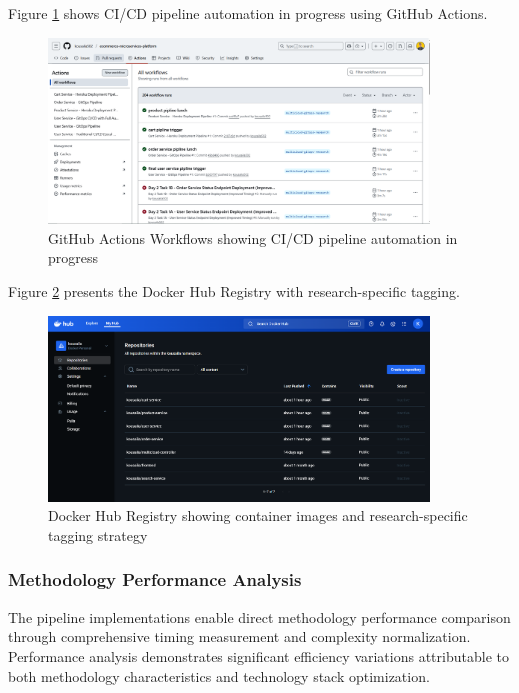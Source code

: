 Figure \ref{fig:github-actions-running} shows CI/CD pipeline automation in progress using GitHub Actions.

\begin{figure}[H]
\centering
\includegraphics[width=0.9\textwidth]{figures/chapter5/github-actions-running.png}
\caption{GitHub Actions Workflows showing CI/CD pipeline automation in progress}
\label{fig:github-actions-running}
\end{figure}

Figure \ref{fig:docker-images-registry} presents the Docker Hub Registry with research-specific tagging.

\begin{figure}[H]
\centering
\includegraphics[width=0.9\textwidth]{figures/chapter5/docker-images-registry.png}
\caption{Docker Hub Registry showing container images and research-specific tagging strategy}
\label{fig:docker-images-registry}
\end{figure}


\subsubsection{Methodology Performance Analysis}

The pipeline implementations enable direct methodology performance comparison through comprehensive timing measurement and complexity normalization. Performance analysis demonstrates significant efficiency variations attributable to both methodology characteristics and technology stack optimization.

